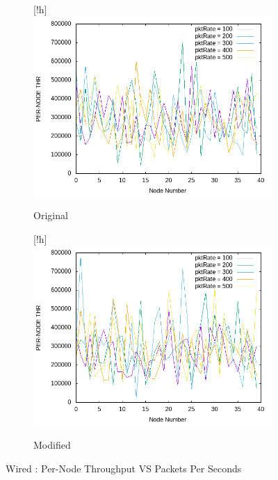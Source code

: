     \begin{figure}[!h]
    	\centering
    	
    	\begin{subfigure}{0.9\textwidth}[!h] %
    		\includegraphics[width=.95\textwidth]{Pictures/Wired/Original/PER-NODETHRVSpktRate.png}
    		\caption{Original} %
    	\end{subfigure}
    	
    	\vspace{1em} %
    	
    	\begin{subfigure}{0.9\textwidth}[!h] %
    		\includegraphics[width=.95\textwidth]{Pictures/Wired/Modified/PER-NODETHRVSpktRate.png}
    		\caption{Modified} %
    	\end{subfigure}
    	
    	\caption{Wired : Per-Node Throughput VS Packets Per Seconds} %
    \end{figure}

    